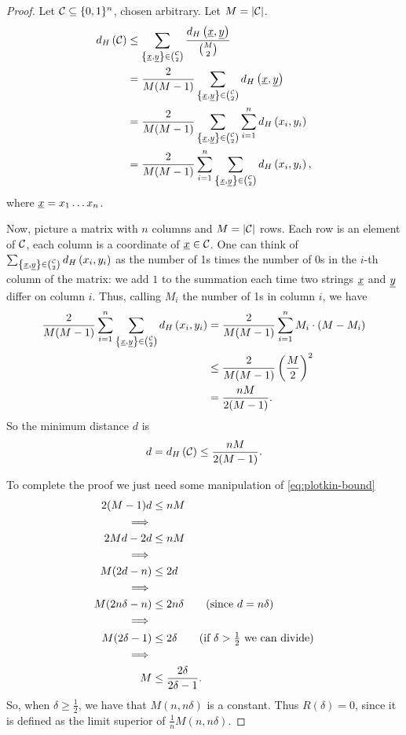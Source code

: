 \begin{proof}
	Let $\mathcal{C} \subseteq \{0, 1\}^n$, chosen arbitrary.
	Let $M = \left|{\mathcal{C}}\right|$.
	\begin{align*}
		d_H \left({\mathcal{C}}\right)
		& \le
		\sum_{\left\{ \underline{x}, \underline{y} \right\} \in \binom{\mathcal{C}}{2}}
		\frac{d_H \left({\underline{x},\underline{y}}\right)}{\binom{M}{2}}
		\\
		& =
		\frac{2}{M (M-1)}
		\sum_{\left\{ \underline{x}, \underline{y} \right\} \in \binom{\mathcal{C}}{2}}
		d_H \left({\underline{x},\underline{y}}\right)
		\\
		& =
		\frac{2}{M (M-1)}
		\sum_{\left\{ \underline{x}, \underline{y} \right\} \in \binom{\mathcal{C}}{2}}
		\sum_{i = 1}^n d_H \left({x_i, y_i}\right)
		\\
		& =
		\frac{2}{M (M-1)}
		\sum_{i = 1}^n
		\sum_{\left\{ \underline{x}, \underline{y} \right\} \in \binom{\mathcal{C}}{2}} d_H \left({x_i, y_i}\right),
	\end{align*}
	where $\underline{x} = x_1 \dots x_n$.

	Now, picture a matrix with $n$ columns and $M = \left|{\mathcal{C}}\right|$ rows.
	Each row is an element of $\mathcal{C}$, each column is a coordinate of $\underline{x} \in \mathcal{C}$.
	One can think of $\sum_{\left\{ \underline{x}, \underline{y} \right\} \in \binom{\mathcal{C}}{2}} d_H \left({x_i, y_i}\right)$ as the number of 1s times the number of 0s in the $i$-th column of the matrix: we add $1$ to the summation each time two strings $\underline{x}$ and $\underline{y}$ differ on column $i$.
	Thus, calling $M_i$ the number of 1s in column $i$, we have
	\begin{align*}
		\frac{2}{M (M-1)}
		\sum_{i = 1}^n
		\sum_{\left\{ \underline{x}, \underline{y} \right\} \in \binom{\mathcal{C}}{2}} d_H \left({x_i, y_i}\right)
		& =
		\frac{2}{M (M-1)}
		\sum_{i = 1}^{n}
		M_i \cdot \left( M - M_i \right)
		\\
		& \le
		\frac{2}{M (M-1)} \left( \frac{M}{2} \right)^2
		\\
		& =
		\frac{n M}{2 (M-1)}.
	\end{align*}
	So the minimum distance $d$ is
	\begin{equation} \label{eq:plotkin-bound}
		d = d_H \left({\mathcal{C}}\right) \le \frac{n M}{2 (M-1)}.
	\end{equation}

	To complete the proof we just need some manipulation of \cref{eq:plotkin-bound}
	\begin{align*}
		2 (M - 1) d & \le n M
		\\
		\implies &
		\\
		2 M d - 2 d & \le n M
		\\
		\implies &
		\\
		M (2 d - n) & \le 2 d
		\\
		\implies &
		\\
		M (2 n \delta - n) & \le 2 n \delta
		\tag{since $d = n \delta$}
		\\
		\implies &
		\\
		M (2 \delta - 1) & \le 2 \delta
		\tag{if $\delta > \frac{1}{2}$ we can divide}
		\\
		\implies &
		\\
		M & \le \frac{2 \delta}{2 \delta - 1}.
	\end{align*}
	So, when $\delta \ge \frac{1}{2}$, we have that $M(n, n \delta)$ is a constant.
	Thus $R(\delta) = 0$, since it is defined as the limit superior of $\frac{1}{n} M(n, n \delta)$.
\end{proof}

